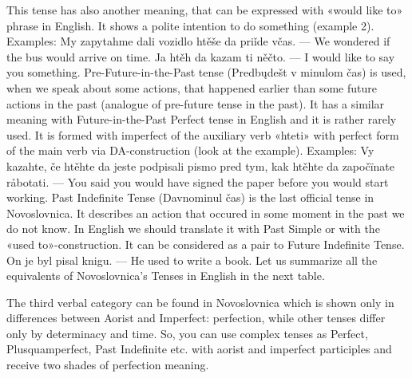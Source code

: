 This tense has also another meaning, that can be expressed with «would like to» phrase in English. It shows a polite intention to do something (example 2).
Examples:
My zapytahme dali vozidlo htěše da priǐde včas. — We wondered if the bus would arrive on time.
Ja htěh da kazam ti něčto. — I would like to say you something.
Pre-Future-in-the-Past tense (Predbųdešt v minulom čas) is used, when we speak about some actions, that happened earlier than some future actions in the past (analogue of pre-future tense in the past). It has a similar meaning with Future-in-the-Past Perfect tense in English and it is rather rarely used.
It is formed with imperfect of the auxiliary verb «hteti» with perfect form of the main verb via DA-construction (look at the example).
Examples:
Vy kazahte, če htěhte da jeste podpisali pismo pred tym, kak htěhte da započïnate råbotati. — You said you would have signed the paper before you would start working.
Past Indefinite Tense (Davnominul čas) is the last official tense in Novoslovnica. It describes an action that occured in some moment in the past we do not know. In English we should translate it with Past Simple or with the «used to»-construction. It can be considered as a pair to Future Indefinite Tense.
On je byl pisal knigu. — He used to write a book.
Let us summarize all the equivalents of Novoslovnica's Tenses in English in the next table.


The third verbal category can be found in Novoslovnica which is shown only in differences between Aorist and Imperfect: perfection, while other tenses differ only by determinacy and time. So, you can use complex tenses as Perfect, Plusquamperfect, Past Indefinite etc. with aorist and imperfect participles and receive two shades of perfection meaning.
